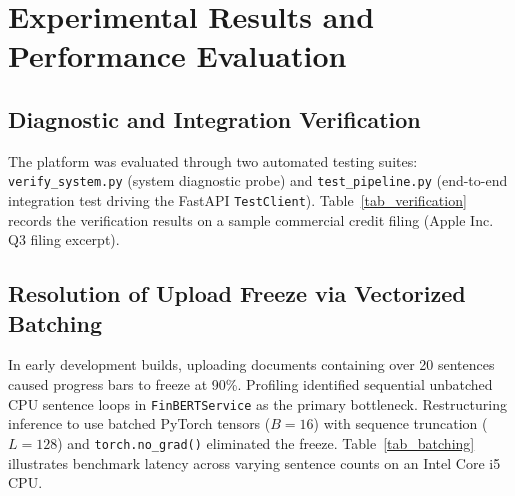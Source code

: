\documentclass[conference]{IEEEtran}
\begin{document}
\section{Experimental Results and Performance Evaluation}

\subsection{Diagnostic and Integration Verification}
The platform was evaluated through two automated testing suites: \texttt{verify\_system.py} (system diagnostic probe) and \texttt{test\_pipeline.py} (end-to-end integration test driving the FastAPI \texttt{TestClient}). Table~\ref{tab_verification} records the verification results on a sample commercial credit filing (Apple Inc. Q3 filing excerpt).

\begin{table}[htbp]
\caption{End-to-End Pipeline Verification Results}
\label{tab_verification}
\centering
{}
\end{table}

\subsection{Resolution of Upload Freeze via Vectorized Batching}
In early development builds, uploading documents containing over 20 sentences caused progress bars to freeze at 90\%. Profiling identified sequential unbatched CPU sentence loops in \texttt{FinBERTService} as the primary bottleneck. Restructuring inference to use batched PyTorch tensors ($B=16$) with sequence truncation ($L=128$) and \texttt{torch.no\_grad()} eliminated the freeze. Table~\ref{tab_batching} illustrates benchmark latency across varying sentence counts on an Intel Core i5 CPU.
\end{document}
